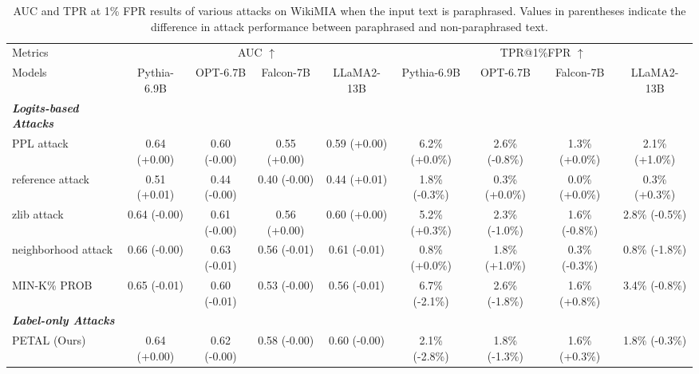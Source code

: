\begin{table*}[!t]
\centering
\setlength{\tabcolsep}{4.0pt}
\caption{AUC and TPR at 1\% FPR results of various attacks on WikiMIA when the input text is paraphrased. Values in parentheses indicate the difference in attack performance between paraphrased and non-paraphrased text.}
\scalebox{0.83}
{
\begin{tabular}{l|cccccccc}
\toprule
Metrics & \multicolumn{4}{c}{AUC $\uparrow$}&  \multicolumn{4}{c}{TPR@1\%FPR  $\uparrow$}\\
\cmidrule(l{5pt}r{5pt}){2-5}\cmidrule(l{5pt}r{5pt}){6-9}
Models & Pythia-6.9B& OPT-6.7B& Falcon-7B& LLaMA2-13B& Pythia-6.9B& OPT-6.7B& Falcon-7B& LLaMA2-13B\\
\midrule
\textbf{\textit{Logits-based Attacks}}&&&&&&&&\\
PPL attack&0.64 (+0.00)&0.60 (-0.00)&0.55 (+0.00)&0.59 (+0.00)&6.2\% (+0.0\%)&2.6\% (-0.8\%)&1.3\% (+0.0\%)&2.1\% (+1.0\%)\\
reference attack&0.51 (+0.01)&0.44 (-0.00)&0.40 (-0.00)&0.44 (+0.01)&1.8\% (-0.3\%)&0.3\% (+0.0\%)&0.0\% (+0.0\%)&0.3\% (+0.3\%)\\
zlib attack&0.64 (-0.00)&0.61 (-0.00)&0.56 (+0.00)&0.60 (+0.00)&5.2\% (+0.3\%)&2.3\% (-1.0\%)&1.6\% (-0.8\%)&2.8\% (-0.5\%)\\
neighborhood attack&0.66 (-0.00)&0.63 (-0.01)&0.56 (-0.01)&0.61 (-0.01)&0.8\% (+0.0\%)&1.8\% (+1.0\%)&0.3\% (-0.3\%)&0.8\% (-1.8\%)\\
MIN-K\% PROB&0.65 (-0.01)&0.60 (-0.01)&0.53 (-0.00)&0.56 (-0.01)&6.7\% (-2.1\%)&2.6\% (-1.8\%)&1.6\% (+0.8\%)&3.4\% (-0.8\%)\\
\textbf{\textit{Label-only Attacks}}&&&&&&&&\\
PETAL (Ours)&0.64 (+0.00)&0.62 (-0.00)&0.58 (-0.00)&0.60 (-0.00)&2.1\% (-2.8\%)&1.8\% (-1.3\%)&1.6\% (+0.3\%)&1.8\% (-0.3\%)\\
\bottomrule
\end{tabular}
}

\label{table:as_paraphrasing}
\end{table*}